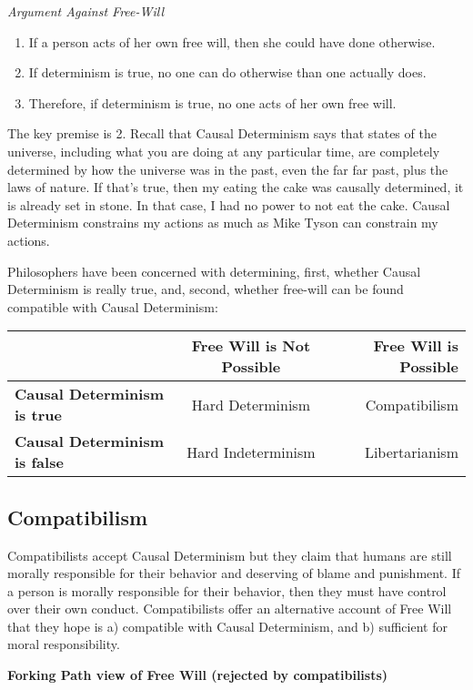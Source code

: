 \documentclass[]{article}
\begin{document}
\emph{Argument Against Free-Will}

\begin{enumerate}
\def\labelenumi{\arabic{enumi}.}
\itemsep1pt\parskip0pt
\item
  If a person acts of her own free will, then she could have done
  otherwise.
\item
  If determinism is true, no one can do otherwise than one actually
  does.
\item
  Therefore, if determinism is true, no one acts of her own free will.
\end{enumerate}

The key premise is 2. Recall that Causal Determinism says that states of
the universe, including what you are doing at any particular time, are
completely determined by how the universe was in the past, even the far
far past, plus the laws of nature. If that's true, then my eating the
cake was causally determined, it is already set in stone. In that case,
I had no power to not eat the cake. Causal Determinism constrains my
actions as much as Mike Tyson can constrain my actions.

Philosophers have been concerned with determining, first, whether Causal
Determinism is really true, and, second, whether free-will can be found
compatible with Causal Determinism:

\begin{longtable}[c]{@{}lcr@{}}
\toprule
& Free Will is Not Possible & Free Will is Possible\tabularnewline
\midrule
\endhead
\textbf{Causal Determinism is true} & Hard Determinism &
Compatibilism\tabularnewline
\textbf{Causal Determinism is false} & Hard Indeterminism &
Libertarianism\tabularnewline
\bottomrule
\end{longtable}

\subsection{Compatibilism}\label{compatibilism}

Compatibilists accept Causal Determinism but they claim that humans are
still morally responsible for their behavior and deserving of blame and
punishment. If a person is morally responsible for their behavior, then
they must have control over their own conduct. Compatibilists offer an
alternative account of Free Will that they hope is a) compatible with
Causal Determinism, and b) sufficient for moral responsibility.

\textbf{Forking Path view of Free Will (rejected by compatibilists)}
\end{document}
